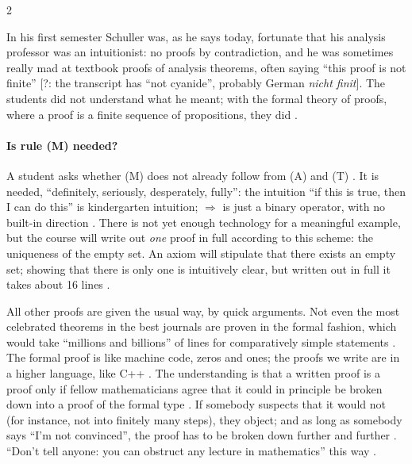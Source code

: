 \begin{paracol}{2}
\begin{aside}
In his first semester Schuller was, as he says today, fortunate that his analysis professor was an intuitionist:
no proofs by contradiction, and he was sometimes really mad at textbook proofs of analysis theorems, often saying
``this proof is not finite'' [?: the transcript has ``not cyanide'', probably German \emph{nicht finit}]. The
students did not understand what he meant; with the formal theory of proofs, where a proof is a finite sequence
of propositions, they did .
\end{aside}

\paragraph{Is rule (M) needed?} A student asks whether (M) does not already follow from (A) and (T)
. It is needed, ``definitely, seriously, desperately, fully'': the intuition ``if this is true,
then I can do this'' is kindergarten intuition; $\Rightarrow$ is just a binary operator, with no built-in
direction . There is not yet enough technology for a meaningful example, but the course will
write out \emph{one} proof in full according to this scheme: the uniqueness of the empty set. An axiom will
stipulate that there exists an empty set; showing that there is only one is intuitively clear, but written out in
full it takes about 16 lines .

\begin{intuition}
All other proofs are given the usual way, by quick arguments. Not even the most celebrated theorems in the best
journals are proven in the formal fashion, which would take ``millions and billions'' of lines for comparatively
simple statements . The formal proof is like machine code, zeros and ones; the proofs we write
are in a higher language, like C++ . The understanding is that a written proof is a proof only if
fellow mathematicians agree that it could in principle be broken down into a proof of the formal type
. If somebody suspects that it would not (for instance, not into finitely many steps), they object;
and as long as somebody says ``I'm not convinced'', the proof has to be broken down further and further
. ``Don't tell anyone: you can obstruct any lecture in mathematics'' this way .
\end{intuition}


\end{paracol}
